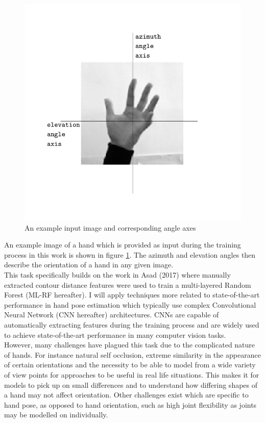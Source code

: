 \documentclass{article}
\begin{document}
\vspace*{-4mm}
\begin{figure}[h]
  \centering
  \includegraphics[scale=0.8]{example_hand2.pdf}
  \vspace*{-10mm}
  \caption{An example input image and corresponding angle axes}
  \label{fig:example_hand}
\end{figure}

An example image of a hand which is provided as input during the training process in this work is shown in figure \ref{fig:example_hand}. The azimuth and elevation angles then describe the orientation of a hand in any given image. \\

This task specifically builds on the work in Asad (2017) where manually extracted contour distance features were used to train a multi-layered Random Forest (ML-RF hereafter). I will apply techniques more related to state-of-the-art performance in hand pose estimation which typically use complex Convolutional Neural Network (CNN hereafter) architectures. CNNs are capable of automatically extracting features during the training process and are widely used to achieve state-of-the-art performance in many computer vision tasks. \\

However, many challenges have plagued this task due to the complicated nature of hands. For instance natural self occlusion, extreme similarity in the appearance of certain orientations and the necessity to be able to model from a wide variety of view points for approaches to be useful in real life situations. This makes it for models to pick up on small differences and to understand how differing shapes of a hand may not affect orientation. Other challenges exist which are specific to hand pose, as opposed to hand orientation, such as high joint flexibility as joints may be modelled on individually. \\
\end{document}
